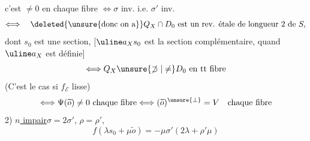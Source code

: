 c'est $\neq0$ en chaque fibre $\Longleftrightarrow\sigma$ inv. i.e. $\sigma'$ inv.
\[
\Longleftrightarrow\quad
\deleted{\unsure{\text{donc on a}}}
Q_X\cap D_0\ \text{est un rev. étale de longueur }2\text{ de }S,
\]
dont $s_0$ est une section,
[$\uline a_Xs_0$ est la section complémentaire,
quand $\uline a_X$ est définie]
\[
\Longleftrightarrow Q_X\unsure{\not\supset|\neq}D_0\ \text{en tt fibre}
\]
(C'est le cas si $f_{\mathcal E}$ lisse)
\[
\Longleftrightarrow\Psi(\widetilde o)\neq0\ \text{chaque fibre}
\Longleftrightarrow(\widetilde o)^{\unsure{\perp}}=V
\quad\text{chaque fibre}
\]
2) \uline{$n$ impair}\quad $\sigma=2\sigma'$, $\rho=\rho'$,
\[
f(\lambda s_0+\mu\widetilde o)=-\mu\sigma'(2\lambda+\rho'\mu)
\]

